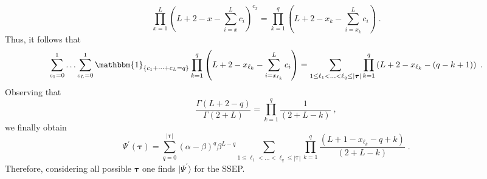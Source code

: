 \documentclass[10pt]{article}
\numberwithin{equation}{section}
\numberwithin{equation}{subsection}
\newcommand{\co}{\;,}
\newcommand{\dt}{\;.}
\begin{document}
\begin{equation}
	\prod_{x=1}^{L}\left(L+2-x-\sum_{i=x}^{L}c_{i}\right)^{c_{x}}=\prod_{k=1}^{q}\left(L+2-x_{k}-\sum_{i=x_{k}}^{L}c_{i}\right)\dt
\end{equation}
Thus, it follows that
\begin{equation}
	\sum_{c_{1}=0}^{1}\ldots\sum_{c_{L}=0}^{1}\mathbbm{1}_{\{c_{1}+\cdots+c_{L}=q\}}\prod_{k=1}^{q}\left(L+2-x_{\ell_{k}}-\sum_{i=x_{\ell_{k}}}^{L}c_{i}\right)=\sum_{1\leq \ell_{1}<\ldots<\ell_{q}\leq |\bm{\tau}|}\prod_{k=1}^{q}\left(L+2-x_{\ell_{k}}-(q-k+1)\right)\dt
\end{equation} 
Observing that
\begin{equation}
	\frac{\Gamma(L+2-q)}{\Gamma(2+L)}=\prod_{k=1}^{q}\frac{1}{(2+L-k)}\co
\end{equation}
we finally obtain 
\begin{equation}\label{PsiI-N2}
	\Psi^{'}(\bm{\tau})=\sum_{q=0}^{|\bm{\tau}|}(\alpha-\beta)^{q}\beta^{L-q}\sum_{1\leq \ell_{1}<\ldots<\ell_{q}\leq |\bm{\tau}|}\prod_{k=1}^{q}\frac{\left(L+1-x_{\ell_{k}}-q+k\right)}{(2+L-k)}\dt
\end{equation}
Therefore, considering all possible $\bm{\tau}$ one finds $|\Psi^{'}\rangle$ for the SSEP. 
\end{document}
